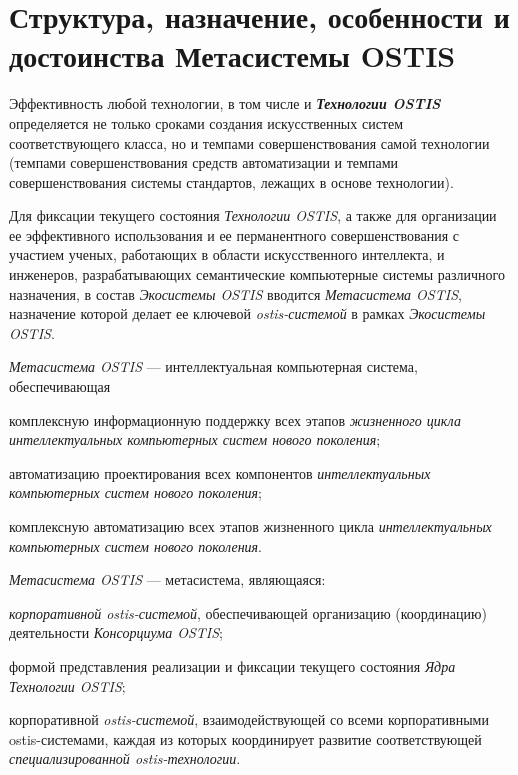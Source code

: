 \section{Структура, назначение, особенности и достоинства Метасистемы OSTIS}
\label{sec_metasystem}

Эффективность любой технологии, в том числе и \textbf{\textit{Технологии OSTIS}} определяется не только сроками создания искусственных систем соответствующего класса, но и темпами совершенствования самой технологии (темпами совершенствования средств автоматизации и темпами совершенствования системы стандартов, лежащих в основе технологии).

Для фиксации текущего состояния \textit{Технологии OSTIS}, а также для организации ее эффективного использования и ее перманентного совершенствования с участием ученых, работающих в области искусственного интеллекта, и инженеров, разрабатывающих семантические компьютерные системы различного назначения, в состав \textit{Экосистемы OSTIS} вводится \textit{Метасистема OSTIS}, назначение которой делает ее ключевой \textit{ostis-системой} в рамках \textit{Экосистемы OSTIS}.

\textit{Метасистема OSTIS} --- интеллектуальная компьютерная система, обеспечивающая 
\begin{textitemize}
	\item комплексную информационную поддержку всех этапов \textit{жизненного цикла} \textit{интеллектуальных компьютерных систем нового поколения};
	\item автоматизацию проектирования всех компонентов \textit{интеллектуальных компьютерных систем нового поколения};
	\item комплексную автоматизацию всех этапов жизненного цикла \textit{интеллектуальных компьютерных систем нового поколения}.
\end{textitemize}

\textit{Метасистема OSTIS} --- метасистема, являющаяся:
\begin{textitemize}
\item \textit{корпоративной ostis-системой}, обеспечивающей организацию (координацию) деятельности \textit{Консорциума OSTIS};
\item формой представления реализации и фиксации текущего состояния \textit{Ядра Технологии OSTIS};
\item корпоративной \textit{ostis-системой}, взаимодействующей со всеми корпоративными ostis-системами, каждая из которых координирует развитие соответствующей \textit{специализированной ostis-технологии}.
\end{textitemize}

